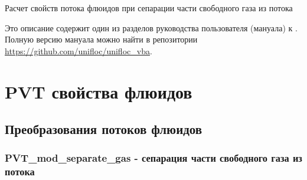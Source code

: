 \documentclass[a4paper,14pt,oneside,openany,article]{memoir}
\begin{document}
	
	

\begin{center}
	{\large Расчет свойств потока флюидов при сепарации части свободного газа из потока}
\end{center}

Это описание содержит один из разделов руководства пользователя (мануала) к \unf{}. Полную версию мануала можно найти в репозитории \href{https://github.com/unifloc/unifloc_vba}{https://github.com/unifloc/unifloc\_vba}.



\chapter{PVT свойства флюидов}

\section{Преобразования потоков флюидов}

\subsection{PVT\_mod\_separate\_gas - сепарация части свободного газа из потока}
	
	
	
%	
%	     
\end{document}
